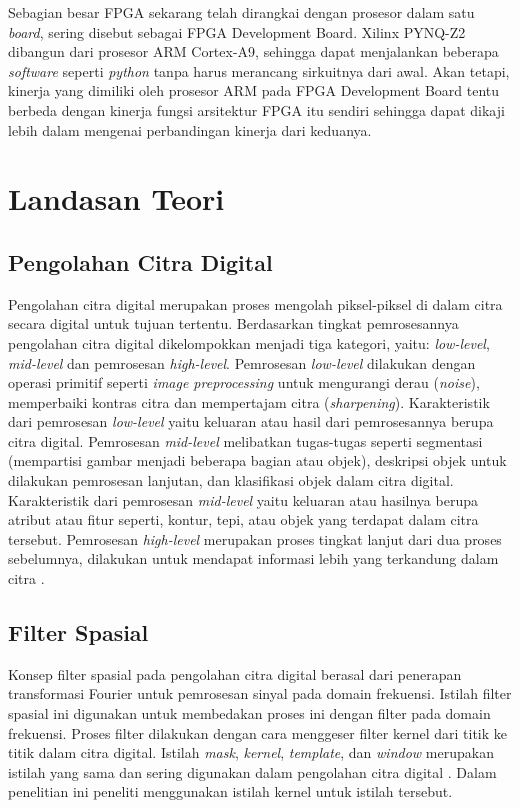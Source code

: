 Sebagian besar FPGA sekarang telah dirangkai dengan prosesor dalam satu \textit{board}, sering disebut sebagai FPGA Development Board. Xilinx PYNQ-Z2 dibangun dari prosesor ARM Cortex-A9, sehingga dapat menjalankan beberapa \textit{software} seperti \textit{python} tanpa harus merancang sirkuitnya dari awal. Akan tetapi, kinerja yang dimiliki oleh prosesor ARM pada FPGA Development Board tentu berbeda dengan kinerja fungsi arsitektur FPGA itu sendiri sehingga dapat dikaji lebih dalam mengenai perbandingan kinerja dari keduanya.



\section{Landasan Teori}

\subsection{Pengolahan Citra Digital}
Pengolahan citra digital merupakan proses mengolah piksel-piksel di dalam citra secara digital untuk tujuan tertentu. Berdasarkan tingkat pemrosesannya pengolahan citra digital dikelompokkan menjadi tiga kategori, yaitu: \textit{low-level}, \textit{mid-level} dan pemrosesan \textit{high-level}. Pemrosesan \textit{low-level} dilakukan dengan operasi primitif seperti \textit{image preprocessing} untuk mengurangi derau (\textit{noise}), memperbaiki kontras citra dan mempertajam citra (\textit{sharpening}). Karakteristik dari pemrosesan \textit{low-level} yaitu keluaran atau hasil dari pemrosesannya berupa citra digital. Pemrosesan \textit{mid-level} melibatkan tugas-tugas seperti segmentasi (mempartisi gambar menjadi beberapa bagian atau objek), deskripsi objek untuk dilakukan pemrosesan lanjutan, dan klasifikasi objek dalam citra digital. Karakteristik dari pemrosesan \textit{mid-level} yaitu keluaran atau hasilnya berupa atribut atau fitur seperti, kontur, tepi, atau objek yang terdapat dalam citra tersebut. Pemrosesan \textit{high-level} merupakan proses tingkat lanjut dari dua proses sebelumnya, dilakukan untuk mendapat informasi lebih yang terkandung dalam citra \cite{book:gonzalez}.

\subsection{Filter Spasial}
Konsep filter spasial pada pengolahan citra digital berasal dari penerapan transformasi Fourier untuk pemrosesan sinyal pada domain frekuensi. Istilah filter spasial ini digunakan untuk membedakan proses ini dengan filter pada domain frekuensi. Proses filter dilakukan dengan cara menggeser filter kernel dari titik ke titik dalam citra digital. Istilah \textit{mask}, \textit{kernel}, \textit{template}, dan \textit{window} merupakan istilah yang sama dan sering digunakan dalam pengolahan citra digital \cite{book:gonzalez}. Dalam penelitian ini peneliti menggunakan istilah kernel untuk istilah tersebut.

